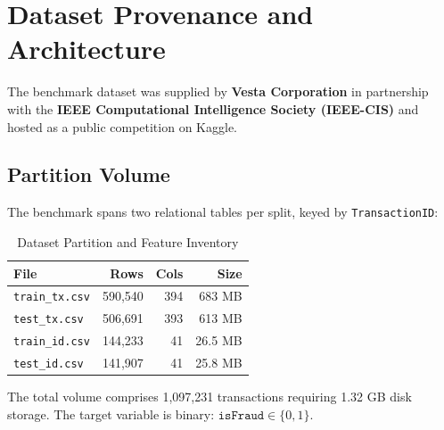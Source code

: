 \documentclass[10pt,twocolumn,a4paper]{article}
\begin{document}
\section{Dataset Provenance and Architecture}
The benchmark dataset was supplied by \textbf{Vesta Corporation} in partnership with the \textbf{IEEE Computational Intelligence Society (IEEE-CIS)} and hosted as a public competition on Kaggle.

\subsection{Partition Volume}
The benchmark spans two relational tables per split, keyed by \texttt{TransactionID}:

\begin{table}[H]
\centering
\caption{Dataset Partition and Feature Inventory}
\label{tab:dataset_summary}
\footnotesize
\begin{tabular*}{\columnwidth}{@{\extracolsep{\fill}}lrrr}
\toprule
\textbf{File} & \textbf{Rows} & \textbf{Cols} & \textbf{Size} \\
\midrule
\texttt{train\_tx.csv} & 590,540 & 394 & 683 MB \\
\texttt{test\_tx.csv}  & 506,691 & 393 & 613 MB \\
\texttt{train\_id.csv} & 144,233 & 41  & 26.5 MB \\
\texttt{test\_id.csv}  & 141,907 & 41  & 25.8 MB \\
\bottomrule
\end{tabular*}
\end{table}

The total volume comprises 1,097,231 transactions requiring 1.32 GB disk storage. The target variable is binary: $\texttt{isFraud} \in \{0, 1\}$.
\end{document}
